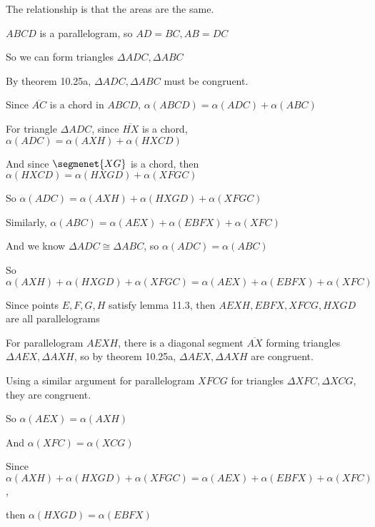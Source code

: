 \documentclass[11pt]{article}
\newcommand{\segment}[1]{\overline{#1}}
\begin{document}
\begin{itemize}
		The relationship is that the areas are the same.

		$ABCD$ is a parallelogram, so $AD = BC, AB = DC$

		So we can form triangles $\Delta ADC, \Delta ABC$

		By theorem 10.25a, $\Delta ADC, \Delta ABC$ must be congruent.

		Since $\segment{AC}$ is a chord in $ABCD$, $\alpha(ABCD) = \alpha(ADC) + \alpha(ABC)$

		For triangle $\Delta ADC$, since $\segment{HX}$ is a chord, $\alpha(ADC) = \alpha(AXH) + \alpha(HXCD)$

		And since $\segmenet{XG}$ is a chord, then $\alpha(HXCD) = \alpha(HXGD) + \alpha(XFGC)$

		So $\alpha(ADC) = \alpha(AXH) + \alpha(HXGD) + \alpha(XFGC)$

		Similarly, $\alpha(ABC) = \alpha(AEX) + \alpha(EBFX) + \alpha(XFC)$

		And we know $\Delta ADC \cong \Delta ABC$, so $\alpha(ADC) = \alpha(ABC)$

		So $\alpha(AXH) + \alpha(HXGD) + \alpha(XFGC) = \alpha(AEX) + \alpha(EBFX) + \alpha(XFC)$

		Since points $E,F,G,H$ satisfy lemma 11.3, then $AEXH, EBFX, XFCG, HXGD$ are all parallelograms

		For parallelogram $AEXH$, there is a diagonal segment $\segment{AX}$ forming triangles $\Delta AEX, \Delta AXH$, so by theorem 10.25a, $\Delta AEX, \Delta AXH$ are congruent.

		Using a similar argument for parallelogram $XFCG$ for triangles $\Delta XFC, \Delta XCG$, they are congruent.

		So $\alpha(AEX) = \alpha(AXH)$

		And $\alpha(XFC) = \alpha(XCG)$

		Since $\alpha(AXH) + \alpha(HXGD) + \alpha(XFGC) = \alpha(AEX) + \alpha(EBFX) + \alpha(XFC)$,

		then $\alpha(HXGD) = \alpha(EBFX)$
\end{itemize}
\end{document}
